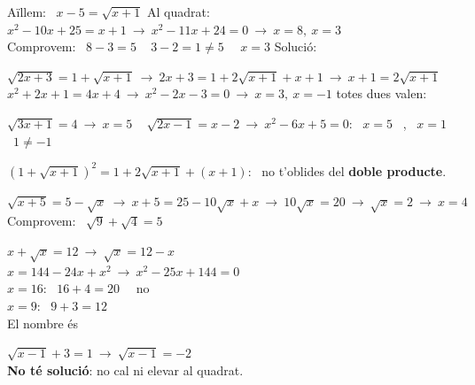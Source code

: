 \documentclass[11pt,a4paper]{article}
\newcommand{\be}[1]{{\color{fmok}\faCheckCircle}\ \ensuremath{#1}}
\newcommand{\mal}[1]{{\color{fmR}\faTimesCircle}\ {\color{fmR}\ensuremath{#1}}}
\begin{document}
\vfill
\begin{exemple}[Exemple: \ $x-\sqrt{x+1}=5$]
Aïllem: \ $x-5=\sqrt{x+1}$ \qquad Al quadrat: \ $x^2-10x+25=x+1\ \to\ x^2-11x+24=0\ \to\ x=8,\ x=3$\\[3pt]
Comprovem: \ $8-3=5$ \be{} \qquad $3-2=1\neq5$ \ \mal{x=3} \qquad Solució: 
\end{exemple}

\vfill
\begin{exemple}[Exemple: \ $\sqrt{2x+3}-\sqrt{x+1}=1$ \ \ (dos radicals)]
$\sqrt{2x+3}=1+\sqrt{x+1}\ \to\ 2x+3=1+2\sqrt{x+1}+x+1\ \to\ x+1=2\sqrt{x+1}$\\[3pt]
$x^2+2x+1=4x+4\ \to\ x^2-2x-3=0\ \to\ x=3,\ x=-1$ \qquad totes dues valen: \ 
\end{exemple}

\vfill
\begin{exemple}[Exemples]
$\sqrt{3x+1}=4\ \to\ x=5$ \be{} \qquad $\sqrt{2x-1}=x-2\ \to\ x^2-6x+5=0$: \ $x=5$ \be{}, \ $x=1$ \mal{1\neq-1}
\end{exemple}

\vfill
\begin{truc}
$(1+\sqrt{x+1})^2=1+2\sqrt{x+1}+(x+1)$: \ no t'oblides del \textbf{doble producte}.
\end{truc}

\vfill
\begin{exemple}[Exemple: \ $\sqrt{x+5}+\sqrt x=5$ \ (deixem un radical a cada membre)]
$\sqrt{x+5}=5-\sqrt x\ \to\ x+5=25-10\sqrt x+x\ \to\ 10\sqrt x=20\ \to\ \sqrt x=2\ \to\ \boxed{x=4}$ \qquad Comprovem: \ $\sqrt9+\sqrt4=5$ \ \be{}
\end{exemple}

\vfill
\begin{minipage}[t]{0.48\linewidth}
\begin{exemple}
$x+\sqrt x=12\ \to\ \sqrt x=12-x$\\[3pt]
$x=144-24x+x^2\ \to\ x^2-25x+144=0$\\[3pt]
$x=16$: \ $16+4=20$ \ \mal{\text{no}}\\[2pt] $x=9$: \ $9+3=12$ \ \be{}\\[3pt]
El nombre és 
\end{exemple}
\end{minipage}\hfill
\begin{minipage}[t]{0.49\linewidth}
\begin{compte}
$\sqrt{x-1}+3=1\ \to\ \sqrt{x-1}=-2$\\[3pt]
\textbf{No té solució}: no cal ni elevar al quadrat.
\end{compte}
\end{minipage}
\end{document}
